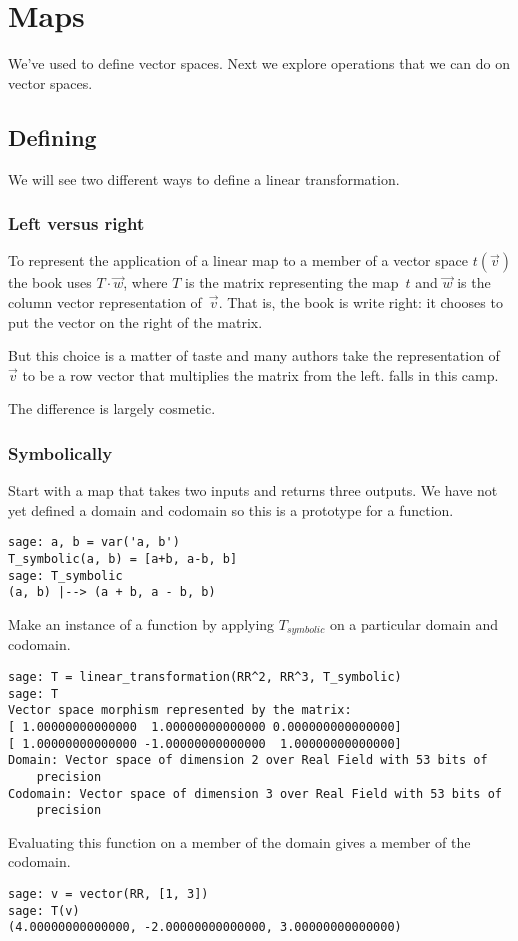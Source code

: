 \chapter{Maps}


We've used \Sage{} to define vector spaces.
Next we explore operations that we can do on vector spaces.
  

\section{Defining}
We will see two different ways to define a linear transformation.

\subsection{Left versus right}
To represent the application of a linear map to a member of a vector space
$t(\vec{v})$ the book uses $T\cdot \vec{w}$, 
where $T$ is the matrix representing
the map~$t$ and $\vec{w}$ is the column vector representation 
of~$\vec{v}$.
That is, the book is write right: it chooses to put the vector on the right 
of the matrix.

But this choice is a matter of taste and many authors take the representation
of $\vec{v}$ to be a row vector that multiplies the matrix from the 
left.
\Sage{} falls in this camp.

The difference is largely cosmetic.




\subsection{Symbolically}
Start with a map that takes two inputs and returns three outputs.
We have not yet defined a domain and codomain 
so this is a prototype for a function.
\begin{lstlisting}
sage: a, b = var('a, b')   
T_symbolic(a, b) = [a+b, a-b, b]         
sage: T_symbolic       
(a, b) |--> (a + b, a - b, b)                
\end{lstlisting}
Make an instance of a function by applying $T_{\textit{symbolic}}$ on a 
particular domain and codomain.
\begin{lstlisting}
sage: T = linear_transformation(RR^2, RR^3, T_symbolic)
sage: T                                                
Vector space morphism represented by the matrix:
[ 1.00000000000000  1.00000000000000 0.000000000000000]
[ 1.00000000000000 -1.00000000000000  1.00000000000000]
Domain: Vector space of dimension 2 over Real Field with 53 bits of 
    precision
Codomain: Vector space of dimension 3 over Real Field with 53 bits of 
    precision
\end{lstlisting}
Evaluating this function on a member of the domain gives a member
of the codomain. 
\begin{lstlisting}
sage: v = vector(RR, [1, 3])  
sage: T(v)
(4.00000000000000, -2.00000000000000, 3.00000000000000)
\end{lstlisting}

